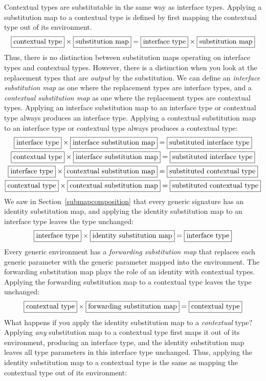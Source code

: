 \documentclass[a4paper,headsepline,bibliography=totoc,toc=flat,fleqn,twoside=semi]{scrbook}
\theoremstyle{definition}
\theoremstyle{definition}
\theoremstyle{definition}
\newcommand{\mathboxed}[1]{\boxed{\mbox{\vphantom{pI\texttt{pI}}#1}}}
\begin{document}
Contextual types are substitutable in the same way as interface types. Applying a substitution map to a contextual type is defined by first mapping the contextual type out of its environment.
\[
\mathboxed{contextual type} \times \mathboxed{substitution map} = \mathboxed{interface type} \times \mathboxed{substitution map}
\]
Thus, there is no distinction between substitution maps operating on interface types and contextual types. However, there is a distinction when you look at the replacement types that are \emph{output} by the substitution. We can define an \emph{interface substitution map} as one where the replacement types are interface types, and a \emph{contextual substitution map} as one where the replacement types are contextual types. Applying an interface substitution map to an interface type or contextual type always produces an interface type. Applying a contextual substitution map to an interface type or contextual type always produces a contextual type:
\begin{gather*}
\mathboxed{interface type} \times \mathboxed{interface substitution map} = \mathboxed{substituted interface type}\\
\mathboxed{contextual type} \times \mathboxed{interface substitution map} = \mathboxed{substituted interface type}\\
\mathboxed{interface type} \times \mathboxed{contextual substitution map} = \mathboxed{substituted contextual type}\\
\mathboxed{contextual type} \times \mathboxed{contextual substitution map} = \mathboxed{substituted contextual type}
\end{gather*}
We saw in Section~\ref{submapcomposition} that every generic signature has an identity substitution map, and applying the identity substitution map to an interface type leaves the type unchanged:
\[\mathboxed{interface type}\times\mathboxed{identity substitution map} = \mathboxed{interface type}\]
Every generic environment has a \emph{forwarding substitution map} that replaces each generic parameter with the generic parameter mapped into the environment. The forwarding substitution map plays the role of an identity with contextual types. Applying the forwarding substitution map to a contextual type leaves the type unchanged:
\[\mathboxed{contextual type}\times\mathboxed{forwarding substitution map} = \mathboxed{contextual type}\]
What happens if you apply the identity substitution map to a \emph{contextual} type? Applying \emph{any} substitution map to a contextual type first maps it out of its environment, producing an interface type, and the identity substitution map leaves all type parameters in this interface type unchanged. Thus, applying the identity substitution map to a contextual type is the same as mapping the contextual type out of its environment:
\end{document}
